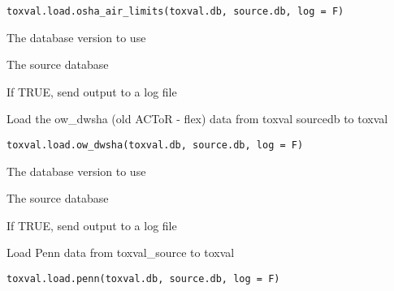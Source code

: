 \documentclass[letterpaper]{book}
\begin{document}
%
\begin{Usage}
\begin{verbatim}
toxval.load.osha_air_limits(toxval.db, source.db, log = F)
\end{verbatim}
\end{Usage}
%
\begin{Arguments}
\begin{ldescription}
\item[\code{toxval.db}] The database version to use

\item[\code{source.db}] The source database

\item[\code{log}] If TRUE, send output to a log file
\end{ldescription}
\end{Arguments}
%
\begin{Description}\relax
Load the ow\_dwsha (old ACToR - flex) data  from toxval sourcedb to toxval
\end{Description}
%
\begin{Usage}
\begin{verbatim}
toxval.load.ow_dwsha(toxval.db, source.db, log = F)
\end{verbatim}
\end{Usage}
%
\begin{Arguments}
\begin{ldescription}
\item[\code{toxval.db}] The database version to use

\item[\code{source.db}] The source database

\item[\code{log}] If TRUE, send output to a log file
\end{ldescription}
\end{Arguments}
%
\begin{Description}\relax
Load Penn data from toxval\_source to toxval
\end{Description}
%
\begin{Usage}
\begin{verbatim}
toxval.load.penn(toxval.db, source.db, log = F)
\end{verbatim}
\end{Usage}
\end{document}
